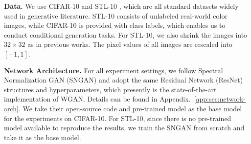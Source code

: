 \documentclass{article}
\begin{document}
\textbf{Data.}
We use CIFAR-10 \cite{krizhevsky2009learning} and STL-10 \cite{coates2011analysis}, which are all standard datasets widely used in generative literature. STL-10 consists of
unlabeled real-world color images, while CIFAR-10 is provided with class labels, which enables us to conduct conditional generation tasks. For STL-10, we also shrink the images into $32\times 32$ as in previous works. The pixel values of all images are rescaled into $[-1, 1]$.


\textbf{Network Architecture.}
For all experiment settings, we follow Spectral Normalization GAN (SNGAN) \cite{miyato2018spectral} and adopt the same Residual Network (ResNet) \cite{he2016deep} structures and hyperparameters, which presently is the state-of-the-art implementation of WGAN. Details can be found in Appendix.~\ref{app:sec:network-arch}. We take their open-source code and pre-trained model as the base model for the experiments on CIFAR-10. For STL-10, since there is no pre-trained model available to reproduce the results, we train the SNGAN from scratch and take it as the base model.
\end{document}
